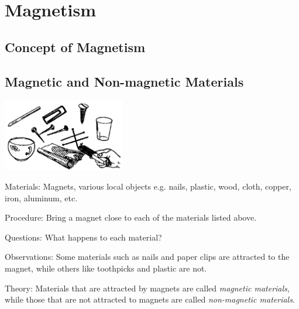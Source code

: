 \section{Magnetism}

\begin{multicols}{2}


\section*{Concept of Magnetism}


\subsection{Magnetic and Non-magnetic Materials}

\begin{center}
\includegraphics[width=0.4\textwidth]{./img/source/mag-non-mag.png}
\end{center}

\begin{description*}
\item[Materials:]{Magnets, various local objects e.g. nails, plastic, wood, cloth, copper, iron, aluminum, etc.}
\item[Procedure:]{Bring a magnet close to each of the materials listed above.}
\item[Questions:]{What happens to each material?}
\item[Observations:]{Some materials such as nails and paper clips are attracted to the magnet, while others like toothpicks and plastic are not.}
\item[Theory:]{Materials that are attracted by magnets are called \emph{magnetic materials}, while those that are not attracted to magnets are called \emph{non-magnetic materials}.}
\end{description*}


\end{multicols}
